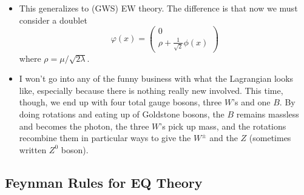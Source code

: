 \begin{itemize}
\item This generalizes to (GWS) EW theory. The difference is that now we must consider a doublet
  \begin{equation}
    \varphi(x) = \begin{pmatrix}0 \\ \rho + \frac{1}{\sqrt{2}}\phi(x)\end{pmatrix}
  \end{equation}
  where $\rho = \mu/\sqrt{2\lambda}$.
\item I won't go into any of the funny business with what the Lagrangian looks like, especially because there is nothing really new involved. This time, though, we end up with four total gauge bosons, three $W$'s and one $B$. By doing rotations and eating up of Goldstone bosons, the $B$ remains massless and becomes the photon, the three $W$'s pick up mass, and the rotations recombine them in particular ways to give the $W^\pm$ and the $Z$ (sometimes written $Z^0$ boson).
\end{itemize}





\subsection{Feynman Rules for EQ Theory}

